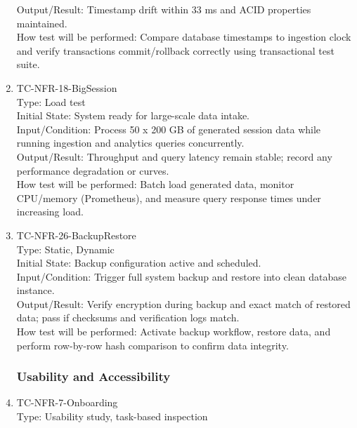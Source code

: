 \documentclass[12pt, titlepage]{article}
\begin{document}
\begin{enumerate}
Output/Result: Timestamp drift within 33 ms and ACID properties maintained.\\

How test will be performed: Compare database timestamps to ingestion clock and verify transactions commit/rollback correctly using transactional test suite.

\item{TC-NFR-18-BigSession\\}
Type: Load test\\

Initial State: System ready for large-scale data intake.\\

Input/Condition: Process 50 x 200 GB of generated session data while running ingestion and analytics queries concurrently.\\

Output/Result: Throughput and query latency remain stable; record any performance degradation or curves.\\

How test will be performed: Batch load generated data, monitor CPU/memory (Prometheus), and measure query response times under increasing load.

\item{TC-NFR-26-BackupRestore\\}
Type: Static, Dynamic\\

Initial State: Backup configuration active and scheduled.\\

Input/Condition: Trigger full system backup and restore into clean database instance.\\

Output/Result: Verify encryption during backup and exact match of restored data; pass if checksums and verification logs match.\\

How test will be performed: Activate backup workflow, restore data, and perform row-by-row hash comparison to confirm data integrity.

\subsubsection{Usability and Accessibility}

\item{TC-NFR-7-Onboarding\\}
Type: Usability study, task-based inspection\\


\end{enumerate}
\end{document}
